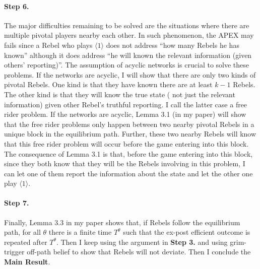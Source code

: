 \documentclass[12pt,letter]{article}
\theoremstyle{definition}
\theoremstyle{remark}
\theoremstyle{claim}
\begin{document}
\paragraph{Step 6.}
The major difficulties remaining to be solved are the situations where there are multiple pivotal players nearby each other. In such phenomenon, the APEX may fails since a Rebel who plays $\langle 1 \rangle$ does not address ``how many Rebels he has known'' although it does address ``he will known the relevant information (given others' reporting)''. The assumption of acyclic networks is crucial to solve these problems. If the networks are acyclic, I will show that there are only two kinds of pivotal Rebels. One kind is that they have known there are at least $k-1$ Rebels. The other kind is that they will know the true state ( not just the relevant information) given other Rebel's truthful reporting. I call the latter case a free rider problem. If the networks are acyclic, Lemma 3.1 (in my paper) will show that the free rider problems only happen between two nearby pivotal Rebels in a unique block in the equilibrium path. Further, these two nearby Rebels will know that this free rider problem will occur before the game entering into this block. The consequence of Lemma 3.1 is that, before the game entering into this block, since they both know that they will be the Rebels involving in this problem, I can let one of them report the information about the state and let the other one play $\langle 1 \rangle$. 

\paragraph{Step 7.}
Finally, Lemma 3.3 in my paper shows that, if Rebels follow the equilibrium path, for all $\theta$ there is a finite time $T^{\theta}$ such that the ex-post efficient outcome is repeated after $T^\theta$. Then I keep using the argument in \textbf{Step 3.} and using grim-trigger off-path belief to show that Rebels will not deviate. Then I conclude the \textbf{Main Result}.

\end{document}

